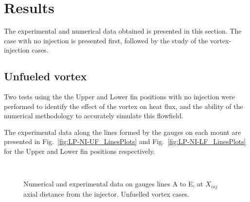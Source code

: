 \documentclass{AIAA}
\begin{document}
\section{Results}

The experimental and numerical data obtained is presented in this section. The case with no injection is presented first, followed by the study of the vortex-injection cases.


\subsection{Unfueled vortex}

Two tests using the the Upper and Lower fin positions with no injection were performed to identify the effect of the vortex on heat flux, and the ability of the numerical methodology to accurately simulate this flowfield.

The experimental data along the lines formed by the gauges on each mount are presented in Fig.~\ref{fig:LP-NI-UF_LinesPlots} and Fig.~\ref{fig:LP-NI-LF_LinesPlots} for the Upper and Lower fin positions respectively.
\begin{figure}[!h]
\center
%
\\
\caption{Numerical and experimental data on gauges lines A to E, at $X_{inj}$ axial distance from the injector. Unfuelled vortex cases.}
\label{fig:HeatFluxVortex_Lines}
\end{figure} 
\end{document}
